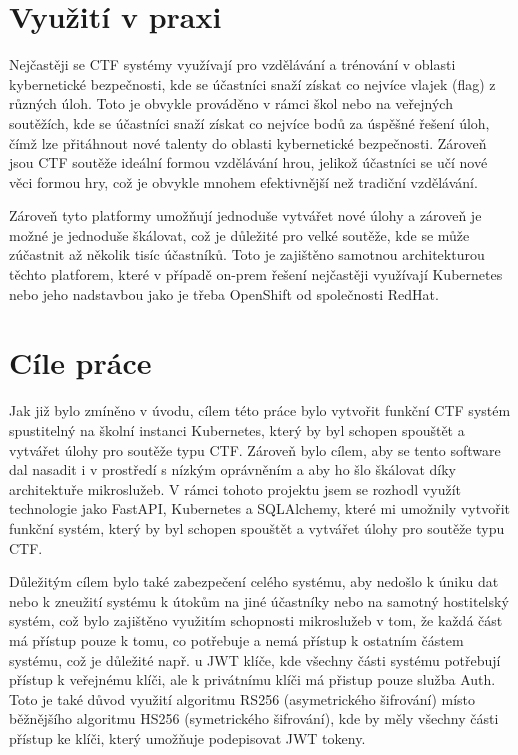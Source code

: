 \documentclass[12pt, a4paper,
oneside,      %
openright
]{report}
\begin{document}
\section{Využití v praxi}
Nejčastěji se CTF systémy využívají pro vzdělávání a trénování v oblasti kybernetické bezpečnosti, kde se účastníci snaží získat co nejvíce vlajek (flag) z různých úloh. Toto je obvykle prováděno v rámci škol nebo na veřejných soutěžích, kde se účastníci snaží získat co nejvíce bodů za úspěšné řešení úloh, čímž lze přitáhnout nové talenty do oblasti kybernetické bezpečnosti. Zároveň jsou CTF soutěže ideální formou vzdělávání hrou, jelikož účastníci se učí nové věci formou hry, což je obvykle mnohem efektivnější než tradiční vzdělávání.

Zároveň tyto platformy umožňují jednoduše vytvářet nové úlohy a zároveň je možné je jednoduše škálovat, což je důležité pro velké soutěže, kde se může zúčastnit až několik tisíc účastníků. Toto je zajištěno samotnou architekturou těchto platforem, které v případě on-prem řešení nejčastěji využívají Kubernetes nebo jeho nadstavbou jako je třeba OpenShift od společnosti RedHat.

\section{Cíle práce}
Jak již bylo zmíněno v úvodu, cílem této práce bylo vytvořit funkční CTF systém spustitelný na školní instanci Kubernetes, který by byl schopen spouštět a vytvářet úlohy pro soutěže typu CTF. Zároveň bylo cílem, aby se tento software dal nasadit i v prostředí s nízkým oprávněním a aby ho šlo škálovat díky architektuře mikroslužeb. V rámci tohoto projektu jsem se rozhodl využít technologie jako FastAPI, Kubernetes a SQLAlchemy, které mi umožnily vytvořit funkční systém, který by byl schopen spouštět a vytvářet úlohy pro soutěže typu CTF. 

Důležitým cílem bylo také zabezpečení celého systému, aby nedošlo k úniku dat nebo k zneužití systému k útokům na jiné účastníky nebo na samotný hostitelský systém, což bylo zajištěno využitím schopnosti mikroslužeb v tom, že každá část má přístup pouze k tomu, co potřebuje a nemá přístup k ostatním částem systému, což je důležité např. u JWT klíče, kde všechny části systému potřebují přístup k veřejnému klíči, ale k privátnímu klíči má přistup pouze služba Auth. Toto je také důvod využití algoritmu RS256 (asymetrického šifrování) místo běžnějšího algoritmu HS256 (symetrického šifrování), kde by měly všechny části přístup ke klíči, který umožňuje podepisovat JWT tokeny.
\end{document}
